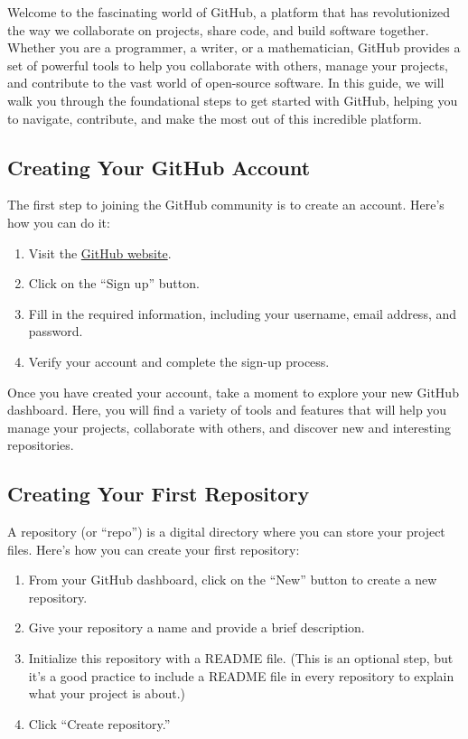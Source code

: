 \documentclass[a4paper,12pt]{book}
\begin{document}
Welcome to the fascinating world of GitHub, a platform that has revolutionized the way we collaborate on projects, share code, and build software together. Whether you are a programmer, a writer, or a mathematician, GitHub provides a set of powerful tools to help you collaborate with others, manage your projects, and contribute to the vast world of open-source software. In this guide, we will walk you through the foundational steps to get started with GitHub, helping you to navigate, contribute, and make the most out of this incredible platform.

\subsection*{Creating Your GitHub Account}

The first step to joining the GitHub community is to create an account. Here’s how you can do it:

\begin{enumerate}
    \item Visit the \href{https://github.com/}{GitHub website}.
    \item Click on the “Sign up” button.
    \item Fill in the required information, including your username, email address, and password.
    \item Verify your account and complete the sign-up process.
\end{enumerate}

Once you have created your account, take a moment to explore your new GitHub dashboard. Here, you will find a variety of tools and features that will help you manage your projects, collaborate with others, and discover new and interesting repositories.

\subsection*{Creating Your First Repository}

A repository (or “repo”) is a digital directory where you can store your project files. Here’s how you can create your first repository:

\begin{enumerate}
    \item From your GitHub dashboard, click on the “New” button to create a new repository.
    \item Give your repository a name and provide a brief description.
    \item Initialize this repository with a README file. (This is an optional step, but it’s a good practice to include a README file in every repository to explain what your project is about.)
    \item Click “Create repository.”
\end{enumerate}
\end{document}
